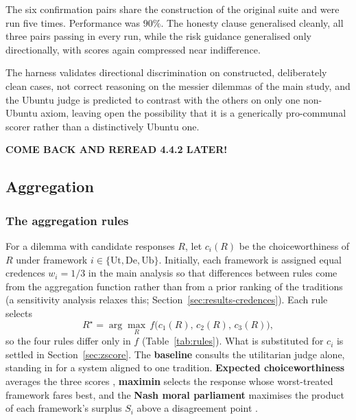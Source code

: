 \documentclass[10pt,twocolumn,a4paper]{article}
\begin{document}
\label{sec:held-out}
The six confirmation pairs share the construction of the original suite
and were run five times. Performance was $90\%$. The honesty clause
generalised cleanly, all three pairs passing in every run, while the
risk guidance generalised only directionally, with scores again
compressed near indifference.


The harness validates directional discrimination on constructed,
deliberately clean cases, not correct reasoning on the messier dilemmas
of the main study, and the Ubuntu judge is predicted to contrast with
the others on only one non-Ubuntu axiom, leaving open the possibility
that it is a generically pro-communal scorer rather than a
distinctively Ubuntu one.

\textbf{COME BACK AND REREAD 4.4.2 LATER!}

\subsection{Aggregation}
\label{sec:aggregation}

\subsubsection{The aggregation rules}
\label{sec:rules}

For a dilemma with candidate responses $R$, let $c_i(R)$ be the
choiceworthiness of $R$ under framework $i \in \{\text{Ut}, \text{De},
\text{Ub}\}$. Initially, each framework is assigned equal credences $w_i = 1/3$ in the main analysis so that
differences between rules come from the aggregation function rather than
from a prior ranking of the traditions (a sensitivity analysis relaxes
this; Section~\ref{sec:results-credences}). Each rule selects
\[
  R^{\star} = \arg\max_{R}\, f\bigl(c_1(R),\, c_2(R),\, c_3(R)\bigr),
\]
so the four rules differ only in $f$ (Table~\ref{tab:rules}). What is
substituted for $c_i$ is settled in Section~\ref{sec:zscore}. The \textbf{baseline} consults the utilitarian
judge alone, standing in for a system aligned to one tradition.
\textbf{Expected choiceworthiness} averages the three scores
\cite{macaskill2020}, \textbf{maximin} selects the response whose
worst-treated framework fares best, and the \textbf{Nash moral
parliament} maximises the product of each framework's surplus $S_i$
above a disagreement point \cite{nash1950}.
\end{document}
